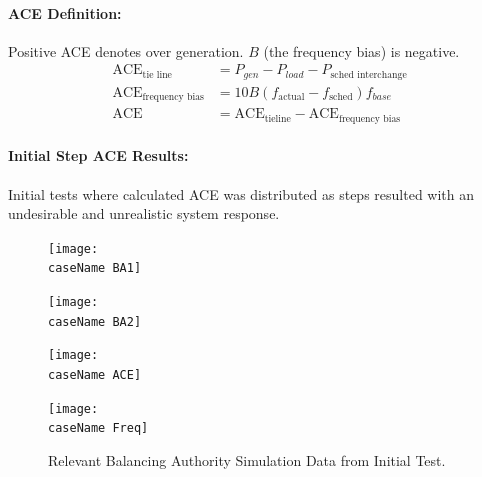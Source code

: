 \documentclass[12pt]{article}
\begin{document}
\pagebreak
\paragraph{ACE Definition:} Positive ACE denotes over generation. $B$ (the frequency bias) is negative.
\begin{align*}
\text{ACE}_{\text{tie line}} &= P_{gen} - P_{load} - P_{\text{sched interchange}}\\
\text{ACE}_{\text{frequency bias}} &= 10B(f_{\text{actual}}-f_{\text{sched}})f_{base}\\
\text{ACE} &= \text{ACE}_{\text{tieline}} -\text{ACE}_{\text{frequency bias}}
\end{align*}

\paragraph{Initial Step ACE Results:} Initial tests where calculated ACE was distributed as steps resulted with an undesirable and unrealistic system response.
\newcommand{\caseName}{SixMachineStepBA}
\newcommand{\testNum}{}
\begin{figure}[h!]
		\centering
		\texttt{[image: \\caseName BA1]}\vspace{-1em}
\end{figure}\vspace{-1.5em}
\begin{figure}[h!]
		\centering
		\texttt{[image: \\caseName BA2]}\vspace{-1em}
\end{figure}\vspace{-1.5em}
\begin{figure}[h!]
		\centering
		\texttt{[image: \\caseName ACE]}\vspace{-1em}
\end{figure}\vspace{-1.5em}
\begin{figure}[h!]
		\centering
		\texttt{[image: \\caseName Freq]}\vspace{-1em}
		\caption{Relevant Balancing Authority Simulation Data from Initial Test.}
		\label{stepTest}		 
\end{figure}\vspace{-1.5em}
\pagebreak
\end{document}
